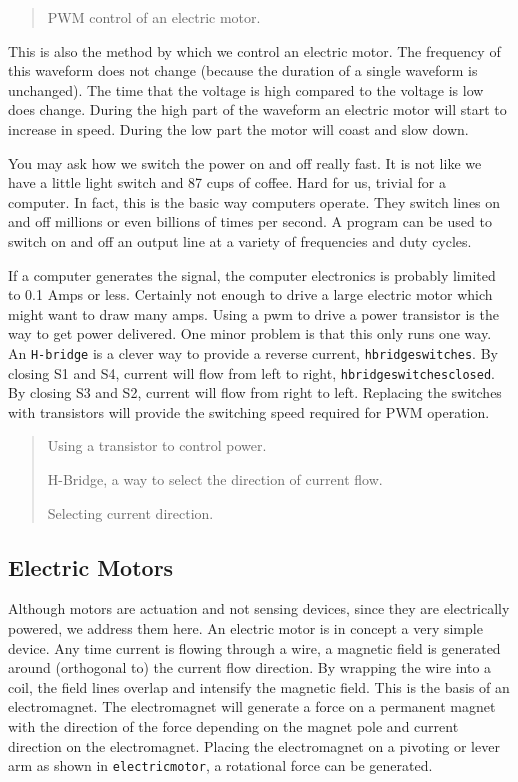 \begin{quote}
PWM control of an electric motor.
\end{quote}

This is also the method by which we control an electric motor. The
frequency of this waveform does not change (because the duration of a
single waveform is unchanged). The time that the voltage is high
compared to the voltage is low does change. During the high part of the
waveform an electric motor will start to increase in speed. During the
low part the motor will coast and slow down.

You may ask how we switch the power on and off really fast. It is not
like we have a little light switch and 87 cups of coffee. Hard for us,
trivial for a computer. In fact, this is the basic way computers
operate. They switch lines on and off millions or even billions of times
per second. A program can be used to switch on and off an output line at
a variety of frequencies and duty cycles.

If a computer generates the signal, the computer electronics is probably
limited to 0.1 Amps or less. Certainly not enough to drive a large
electric motor which might want to draw many amps. Using a pwm to drive
a power transistor is the way to get power delivered. One minor problem
is that this only runs one way. An \texttt{H-bridge} is a clever way to
provide a reverse current, \texttt{hbridgeswitches}. By closing S1 and
S4, current will flow from left to right,
\texttt{hbridgeswitchesclosed}. By closing S3 and S2, current will flow
from right to left. Replacing the switches with transistors will provide
the switching speed required for PWM operation.

\begin{quote}
Using a transistor to control power.

H-Bridge, a way to select the direction of current flow.

Selecting current direction.
\end{quote}

\hypertarget{electric-motors}{%
\subsection{Electric Motors}\label{electric-motors}}

Although motors are actuation and not sensing devices, since they are
electrically powered, we address them here. An electric motor is in
concept a very simple device. Any time current is flowing through a
wire, a magnetic field is generated around (orthogonal to) the current
flow direction. By wrapping the wire into a coil, the field lines
overlap and intensify the magnetic field. This is the basis of an
electromagnet. The electromagnet will generate a force on a permanent
magnet with the direction of the force depending on the magnet pole and
current direction on the electromagnet. Placing the electromagnet on a
pivoting or lever arm as shown in \texttt{electricmotor}, a rotational
force can be generated.

